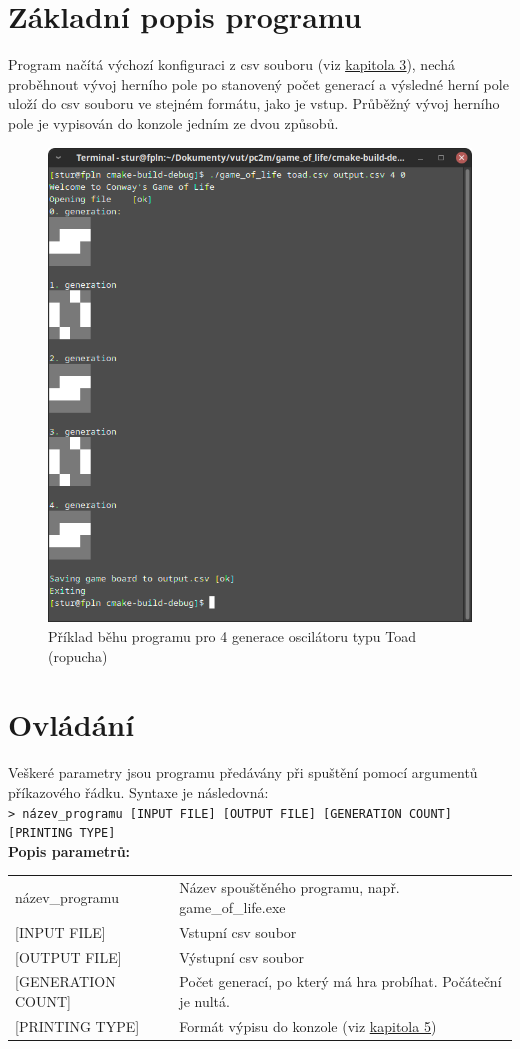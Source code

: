 \section{Základní popis programu}
\label{sec:zak_pop}
Program načítá výchozí konfiguraci z csv souboru (viz \underline{\hyperref[sec:format]{kapitola 3}}), nechá proběhnout vývoj herního pole po stanovený počet generací a výsledné herní pole uloží do csv souboru ve stejném formátu, jako je vstup. Průběžný vývoj herního pole je vypisován do konzole jedním ze dvou způsobů.
\begin{figure}[H]
	\centering
	\includegraphics[width=.5\textwidth]{images/toad_run.png}
	\caption{Příklad běhu programu pro 4 generace oscilátoru typu Toad (ropucha)}
	\label{img:1}
\end{figure}

\section{Ovládání}
\label{sec:ovl}
Veškeré parametry jsou programu předávány při spuštění pomocí argumentů příkazového řádku. Syntaxe je následovná:\\
	\texttt{> název{\_}programu [INPUT FILE] [OUTPUT FILE] [GENERATION COUNT] [PRINTING TYPE]}\\
\textbf{Popis parametrů:}\\
\begin{tabular}{l l}
	název{\_}programu & Název spouštěného programu, např. game{\_}of{\_}life.exe \\
	{[INPUT FILE]} & Vstupní csv soubor \\
	{[OUTPUT FILE]} & Výstupní csv soubor \\
	{[GENERATION COUNT]} & Počet generací, po který má hra probíhat. Počáteční je nultá. \\
	{[PRINTING TYPE]} & Formát výpisu do konzole (viz \underline{\hyperref[sec:vypis]{kapitola 5}})
\end{tabular}


